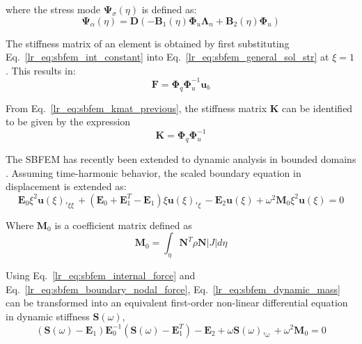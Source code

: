 where the stress mode $\mathbf{\Psi}_\sigma(\eta)$ is defined as:
\begin{equation}
    \mathbf{\Psi}_\alpha(\eta) =    \mathbf{D}(
                                       -\mathbf{B}_1(\eta) \mathbf{\Phi}_u \mathbf{\Lambda}_n +
                                        \mathbf{B}_2(\eta) \mathbf{\Phi}_u
                                    )
    \label{lr_eq:sbfem_stress_mode}
\end{equation}

The stiffness matrix of an element is obtained by first substituting Eq.~\ref{lr_eq:sbfem_int_constant} into Eq.~\ref{lr_eq:sbfem_general_sol_str} at $\xi=1$.
This results in:
\begin{equation}
    \mathbf{F} = \mathbf{\Phi}_q \mathbf{\Phi}_u^{-1} \mathbf{u}_b
    \label{lr_eq:sbfem_kmat_previous}
\end{equation}

From Eq.~\ref{lr_eq:sbfem_kmat_previous}, the stiffness matrix $\mathbf{K}$ can be identified to be given by the expression
\begin{equation}
    \mathbf{K} = \mathbf{\Phi}_q \mathbf{\Phi}_u^{-1}
    \label{lr_eq:sbfem_kmat}
\end{equation}

The SBFEM has recently been extended to dynamic analysis in bounded domains \citep{Song2009}.
Assuming time-harmonic behavior, the scaled boundary equation in displacement is extended as:
\begin{equation}
    \mathbf{E}_0 \xi^2 \mathbf{u}(\xi),_{\xi\xi} +
    (\mathbf{E}_0 + \mathbf{E}_1^T - \mathbf{E}_1)\xi \mathbf{u}(\xi),_{\xi} -
    \mathbf{E}_2 \mathbf{u}(\xi) + \omega^2 \mathbf{M}_0 \xi^2 \mathbf{u}(\xi) = 0
    \label{lr_eq:sbfem_dynamic}
\end{equation}

Where $\mathbf{M}_0$ is a coefficient matrix defined as
\begin{equation}
    \mathbf{M}_0 = \int_\eta \mathbf{N}^T \rho \mathbf{N}|J| d\eta
    \label{lr_eq:sbfem_dynamic_mass}
\end{equation}

Using Eq.~\ref{lr_eq:sbfem_internal_force} and Eq.~\ref{lr_eq:sbfem_boundary_nodal_force}, Eq.~\ref{lr_eq:sbfem_dynamic_mass} can be transformed into an equivalent first-order non-linear differential equation in dynamic stiffness $\mathbf{S}(\omega)$,
\begin{equation}
    (\mathbf{S}(\omega)-\mathbf{E}_1)\mathbf{E}_0^{-1}
    (\mathbf{S}(\omega)-\mathbf{E}_1^T) - \mathbf{E}_2 +
    \omega \mathbf{S}(\omega),_\omega + \omega^2 \mathbf{M}_0 = 0
    \label{lr_eq:sbfem_dynamic_1stODE}
\end{equation}

